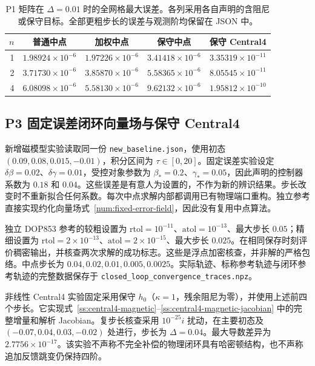 \begin{table}[t]
\centering
\caption{P1 矩阵在 $\Delta=0.01$ 时的全网格最大误差。各列采用各自声明的含阻尼或保守目标。全部更粗步长的误差与观测阶均保留在 JSON 中。}
\label{sx:framework-matrix-errors}
\begin{tabular}{rcccc}
\toprule
$n$ & 普通中点 & 加权中点 & 保守中点 & 保守 Central4\\
\midrule
1 & $1.98924\times10^{-6}$ & $1.97226\times10^{-6}$ & $3.41418\times10^{-6}$ & $3.35319\times10^{-11}$ \\
2 & $3.71730\times10^{-6}$ & $3.85870\times10^{-6}$ & $5.58365\times10^{-6}$ & $8.05545\times10^{-11}$ \\
4 & $6.08098\times10^{-6}$ & $5.58130\times10^{-6}$ & $9.62132\times10^{-6}$ & $1.95812\times10^{-10}$ \\
\bottomrule
\end{tabular}
\end{table}

\subsection{P3 固定误差闭环向量场与保守 Central4}
\label{sx:framework-closed}
新增磁模型实验读取同一份 \texttt{new\_baseline.json}，使用初态 $(0.09,0.08,0.015,-0.01)$，积分区间为 $\tau\in[0,20]$。固定误差实验设定 $\delta\beta=0.02$、$\delta\gamma=0.01$，受控对象参数为 $\beta_*=0.2$、$\gamma_*=0.05$，因此声明的控制器系数为 $0.18$ 和 $0.04$。这些误差是有意人为设置的，不作为新的辨识结果。步长改变时不重新拟合任何系数。每次中点求解内部都调用已有物理端口重构。独立参考直接实现约化向量场式~\eqref{num:fixed-error-field}，因此没有复用中点算法。

独立 DOP853 参考的较粗设置为 $\mathrm{rtol}=10^{-11}$、$\mathrm{atol}=10^{-13}$、最大步长 $0.05$；精细设置为 $\mathrm{rtol}=2\times10^{-13}$、$\mathrm{atol}=2\times10^{-15}$、最大步长 $0.025$。在相同保存时刻评价稠密输出，并核查两次求解的成功标志。这些是浮点加密核查，并非解的严格包络。中点步长为 $0.04,0.02,0.01,0.005,0.0025$。实际轨迹、标称参考轨迹与闭环参考轨迹的完整数据保存于 \texttt{closed\_loop\_convergence\_traces.npz}。

非线性 Central4 实验固定采用保守 $h_0$（$\kappa=1$，残余阻尼为零），并使用上述前四个步长。它实现式~\eqref{ss:central4-magnetic}--\eqref{ss:central4-magnetic-jacobian} 中的完整增量和解析 Jacobian。复步长核查采用 $10^{-25}i$ 扰动，在主要初态及 $(-0.07,0.04,0.03,-0.02)$ 处进行，步长为 $\Delta=0.04$。最大导数差异为 $2.7756\times10^{-17}$。该实验不声称不完全补偿的物理闭环具有哈密顿结构，也不声称追加反馈跳变仍保持四阶。

